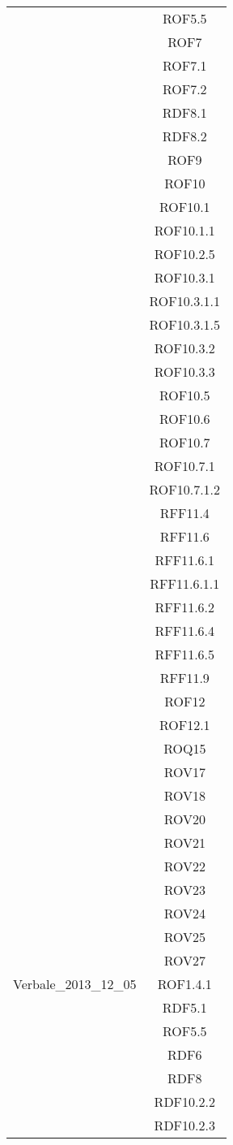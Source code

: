 \begin{longtable}{|c|c|}
& ROF5.5\\
& ROF7\\
& ROF7.1\\
& ROF7.2\\
& RDF8.1\\
& RDF8.2\\
& ROF9\\
& ROF10\\
& ROF10.1\\
& ROF10.1.1\\
& ROF10.2.5\\
& ROF10.3.1\\
& ROF10.3.1.1\\
& ROF10.3.1.5\\
& ROF10.3.2\\
& ROF10.3.3\\
& ROF10.5\\
& ROF10.6\\
& ROF10.7\\
& ROF10.7.1\\
& ROF10.7.1.2\\
& RFF11.4\\
& RFF11.6\\
& RFF11.6.1\\
& RFF11.6.1.1\\
& RFF11.6.2\\
& RFF11.6.4\\
& RFF11.6.5\\
& RFF11.9\\
& ROF12\\
& ROF12.1\\
& ROQ15\\
& ROV17\\
& ROV18\\
& ROV20\\
& ROV21\\
& ROV22\\
& ROV23\\
& ROV24\\
& ROV25\\
& ROV27\\


\midrule
Verbale\_2013\_12\_05
& ROF1.4.1\\
& RDF5.1\\
& ROF5.5\\
& RDF6\\
& RDF8\\
& RDF10.2.2\\
& RDF10.2.3\\


\end{longtable}
